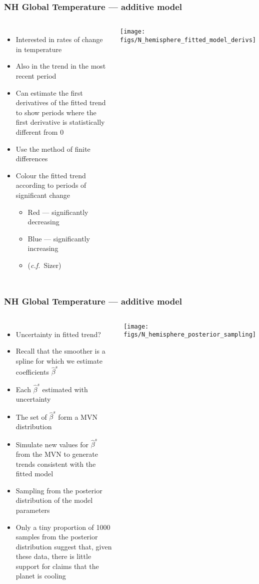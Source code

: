 \documentclass{beamer}
\begin{document}
\begin{frame}
    \frametitle{NH Global Temperature --- additive model}
    \begin{columns}
        \column{7cm}
        \begin{itemize}
            \item Interested in rates of change in temperature
            \item Also in the trend in the most recent period
            \item Can estimate the first derivatives of the fitted trend to show periods where the first derivative is statistically different from 0
            \item Use the method of \alert{finite differences}
            \item Colour the fitted trend according to periods of significant change
            \begin{itemize}
                \item Red --- significantly decreasing
                \item Blue --- significantly increasing
                \item (\textit{c.f.}~Sizer)
            \end{itemize}
        \end{itemize}
        
        \column{5cm}
        \texttt{[image: figs/N\_hemisphere\_fitted\_model\_derivs]}
    \end{columns}
\end{frame}

\begin{frame}
    \frametitle{NH Global Temperature --- additive model}
    \begin{columns}
        \column{7cm}
        \begin{itemize}
            \item Uncertainty in fitted trend?
            \item Recall that the smoother is a spline for which we estimate coefficients $\hat{\beta}^s$
            \item Each $\hat{\beta}^s$ estimated with uncertainty
            \item The set of $\hat{\beta}^s$ form a MVN distribution
            \item Simulate new values for $\hat{\beta}^s$ from the MVN to generate trends consistent with the fitted model
            \item \alert{Sampling from the posterior distribution of the model parameters}
            \item Only a tiny proportion of 1000 samples from the posterior distribution suggest that, \alert{given these data}, there is little support for claims that the planet is cooling
        \end{itemize}
        
        \column{5cm}
        \texttt{[image: figs/N\_hemisphere\_posterior\_sampling]}
    \end{columns}
\end{frame}
\end{document}
